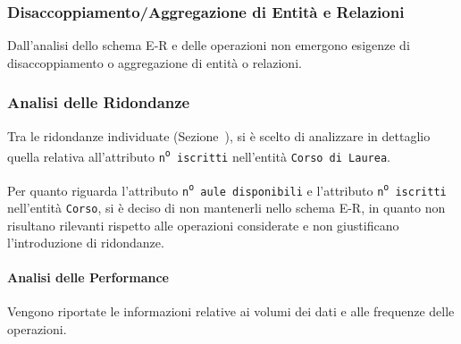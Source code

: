 \documentclass[a4paper,11pt]{article}
\begin{document}
\subsubsection{Disaccoppiamento/Aggregazione di Entità e Relazioni}

Dall'analisi dello schema E-R e delle operazioni non emergono esigenze di disaccoppiamento o aggregazione di entità o relazioni.


\subsubsection{Analisi delle Ridondanze}

Tra le ridondanze individuate (Sezione~), si è scelto di analizzare in dettaglio quella relativa all'attributo \texttt{n\textsuperscript{o} iscritti} nell'entità \texttt{Corso di Laurea}.

Per quanto riguarda l'attributo \texttt{n\textsuperscript{o} aule disponibili} e l'attributo \texttt{n\textsuperscript{o} iscritti} nell'entità \texttt{Corso}, si è deciso di non mantenerli nello schema E-R, in quanto non risultano rilevanti rispetto alle operazioni considerate e non giustificano l'introduzione di ridondanze.


\paragraph{Analisi delle Performance}

Vengono riportate le informazioni relative ai volumi dei dati e alle frequenze delle operazioni.
\end{document}
